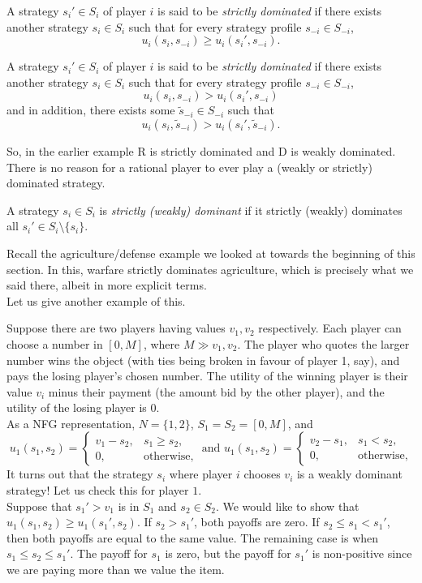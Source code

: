 	\begin{fdef}
		A strategy $s_i' \in S_i$ of player $i$ is said to be \emph{strictly dominated} if there exists another strategy $s_i \in S_i$ such that for every strategy profile $s_{-i} \in S_{-i}$,
		\[ u_i(s_i,s_{-i}) \ge u_i(s_i',s_{-i}). \]

		A strategy $s_i' \in S_i$ of player $i$ is said to be \emph{strictly dominated} if there exists another strategy $s_i \in S_i$ such that for every strategy profile $s_{-i} \in S_{-i}$,
		\[ u_i(s_i,s_{-i}) > u_i(s_i',s_{-i}) \]
		and in addition, there exists some $\tilde{s}_{-i} \in S_{-i}$ such that
		\[ u_i(s_i,\tilde{s}_{-i}) > u_i(s_i',\tilde{s}_{-i}). \]
	\end{fdef}
	So, in the earlier example R is strictly dominated and D is weakly dominated.\\
	There is no reason for a rational player to ever play a (weakly or strictly) dominated strategy.

	\begin{fdef}
		A strategy $s_i \in S_i$ is \emph{strictly (weakly) dominant} if it strictly (weakly) dominates all $s_i' \in S_i \setminus \{s_i\}$.
	\end{fdef}

	Recall the agriculture/defense example we looked at towards the beginning of this section. In this, warfare strictly dominates agriculture, which is precisely what we said there, albeit in more explicit terms.\\

	Let us give another example of this.

	\begin{fex}
		Suppose there are two players having values $v_1,v_2$ respectively. Each player can choose a number in $[0,M]$, where $M \gg v_1,v_2$. The player who quotes the larger number wins the object (with ties being broken in favour of player \textsf{1}, say), and pays the losing player's chosen number. The utility of the winning player is their value $v_i$ minus their payment (the amount bid by the other player), and the utility of the losing player is $0$.\\
		As a NFG representation, $N = \{1,2\}$, $S_1 = S_2 = [0,M]$, and
		\[ u_1(s_1,s_2) = \begin{cases} v_1 - s_2, & s_1 \ge s_2, \\ 0, & \text{otherwise,} \end{cases} \text{ and } u_1(s_1,s_2) = \begin{cases} v_2 - s_1, & s_1 < s_2, \\ 0, & \text{otherwise,} \end{cases} \]
		It turns out that the strategy $s_i$ where player $i$ chooses $v_i$ is a weakly dominant strategy! Let us check this for player $1$.\\
		Suppose that $s_1' > v_1$ is in $S_1$ and $s_2 \in S_2$. We would like to show that $u_1(s_1,s_2) \ge u_1(s_1',s_2)$. If $s_2 > s_1'$, both payoffs are zero. If $s_2 \le s_1 < s_1'$, then both payoffs are equal to the same value. The remaining case is when $s_1 \le s_2 \le s_1'$. The payoff for $s_1$ is zero, but the payoff for $s_1'$ is non-positive since we are paying more than we value the item.
	\end{fex}